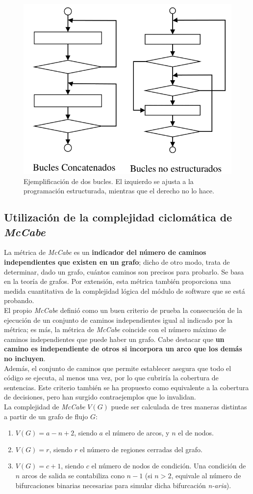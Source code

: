 \begin{figure}[H]
    \centering
    \includegraphics[width=0.5\linewidth]{Resources/Tema6/Ejemplo_BucleNoEstructurado.png}
    \caption{Ejemplificación de dos bucles. El izquierdo se ajusta a la programación estructurada, mientras que el derecho no lo hace.}
\end{figure}

\subsection{Utilización de la complejidad ciclomática de \textit{McCabe}}

La métrica de \textit{McCabe} es un \textbf{indicador del número de caminos independientes que existen en un grafo}; dicho de otro modo, trata de determinar, dado un grafo, cuántos caminos son precisos para probarlo. Se basa en la teoría de grafos. Por extensión, esta métrica también proporciona una medida cuantitativa de la complejidad lógica del módulo de software que se está probando.\\

El propio \textit{McCabe} definió como un buen criterio de prueba la consecución de la ejecución de un conjunto de caminos independientes igual al indicado por la métrica; es más, la métrica de \textit{McCabe} coincide con el número máximo de caminos independientes que puede haber un grafo. Cabe destacar que \textbf{un camino es independiente de otros si incorpora un arco que los demás no incluyen}.\\

Además, el conjunto de caminos que permite establecer asegura que todo el código se ejecuta, al menos una vez, por lo que cubriría la cobertura de sentencias. Este criterio también se ha propuesto como equivalente a la cobertura de decisiones, pero han surgido contraejemplos que lo invalidan.\\

La complejidad de \textit{McCabe} $V (G)$ puede ser calculada de tres maneras distintas a partir de un grafo de flujo $G$:
\begin{enumerate}
    \item $V (G) = a-n+2$, siendo $a$ el número de arcos, y $n$ el de nodos.
    \item $V (G) = r$, siendo $r$ el número de regiones cerradas del grafo.
    \item $V (G) = c+1$, siendo $c$ el número de nodos de condición. Una condición de $n$ arcos de salida se contabiliza cono $n-1$ (si $n>2$, equivale al número de bifurcaciones binarias necesarias para simular dicha bifurcación \textit{n-aria}).
\end{enumerate}

